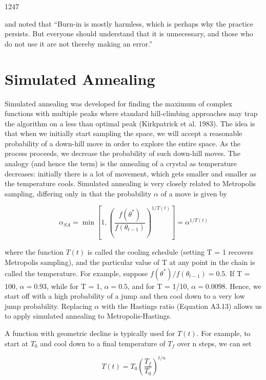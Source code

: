 \documentclass{article}
\begin{document}
1247

and noted that “Burn-in is mostly harmless, which is perhaps why the practice persists. But everyone should understand that it is unnecessary, and those who do not use it are not thereby making an error.”

\section{Simulated Annealing}
Simulated annealing was developed for finding the maximum of complex functions with multiple peaks where standard hill-climbing approaches may trap the algorithm on a less than optimal peak (Kirkpatrick et al. 1983). The idea is that when we initially start sampling the space, we will accept a reasonable probability of a down-hill move in order to explore the entire space. As the process proceeds, we decrease the probability of such down-hill moves. The analogy (and hence the term) is the annealing of a crystal as temperature decreases: initially there is a lot of movement, which gets smaller and smaller as the temperature cools. Simulated annealing is very closely related to Metropolis sampling, differing only in that the probability  $ \alpha $ of a move is given by

\begin{equation}
\alpha_{S A}=\min\left[1,\left(\frac{f(\theta^{*})}{f(\theta_{t-1})}\right)^{1/T(t)}\right]=\alpha^{1/T(t)}
\end{equation}

where the function  $ T(t) $ is called the cooling schedule (setting T = 1 recovers Metropolis sampling), and the particular value of T at any point in the chain is called the temperature. For example, suppose  $ f(\theta^*)/f(\theta_{t-1}) = 0.5 $. If T = 100,  $ \alpha = 0.93 $, while for T = 1,  $ \alpha = 0.5 $, and for T = 1/10,  $ \alpha = 0.0098 $. Hence, we start off with a high probability of a jump and then cool down to a very low jump probability. Replacing  $ \alpha $ with the Hastings ratio (Equation A3.13) allows us to apply simulated annealing to Metropolis-Hastings.

A function with geometric decline is typically used for  $ T(t) $. For example, to start at  $ T_{0} $ and cool down to a final temperature of  $ T_{f} $ over n steps, we can set

\begin{equation}
T(t)=T_{0}\left(\frac{T_{f}}{T_{0}}\right)^{t/n}
\end{equation}
\end{document}
